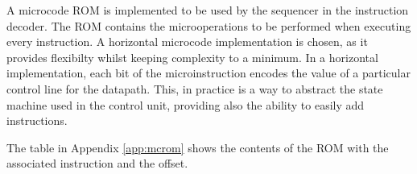 \label{subsec:microcode_rom}
A microcode ROM is implemented to be used by the sequencer in the instruction
decoder. The ROM contains the microoperations to be performed when executing
every instruction. A horizontal microcode implementation is chosen, as it
provides flexibilty whilst keeping complexity to a minimum. In a horizontal
implementation, each bit of the microinstruction encodes the value of a
particular control line for the datapath. This, in practice is a way to
abstract the state machine used in the control unit, providing also the ability
to easily add instructions.\par

The table in Appendix \ref{app:mcrom} shows the contents of
the ROM with the associated instruction and the offset.
